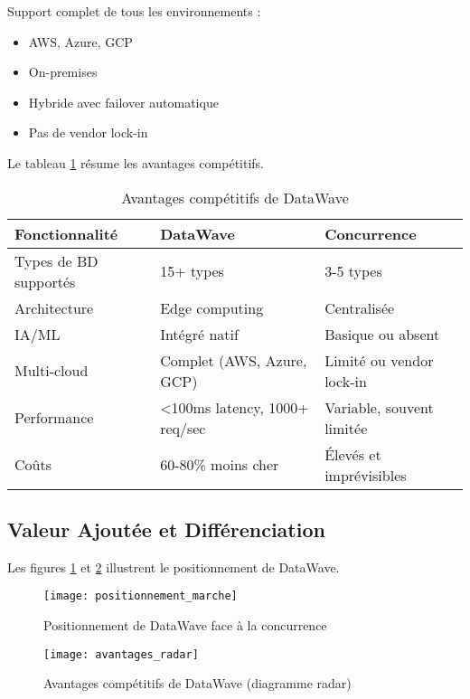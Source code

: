 Support complet de tous les environnements :
\begin{itemize}
    \item AWS, Azure, GCP
    \item On-premises
    \item Hybride avec failover automatique
    \item Pas de vendor lock-in
\end{itemize}

Le tableau \ref{tab:avantages_datawave} résume les avantages compétitifs.

\begin{table}[htpb]
\centering
\caption{Avantages compétitifs de DataWave}
\label{tab:avantages_datawave}
\begin{tabular}{|p{}|p{}|p{}|}
\hline
\textbf{Fonctionnalité} & \textbf{DataWave} & \textbf{Concurrence} \\
\hline
Types de BD supportés & 15+ types & 3-5 types \\
\hline
Architecture & Edge computing & Centralisée \\
\hline
IA/ML & Intégré natif & Basique ou absent \\
\hline
Multi-cloud & Complet (AWS, Azure, GCP) & Limité ou vendor lock-in \\
\hline
Performance & <100ms latency, 1000+ req/sec & Variable, souvent limitée \\
\hline
Coûts & 60-80\% moins cher & Élevés et imprévisibles \\
\hline
\end{tabular}
\end{table}

\subsection{Valeur Ajoutée et Différenciation}

Les figures \ref{fig:positionnement_marche} et \ref{fig:avantages_radar} illustrent le positionnement de DataWave.

\begin{figure}[htpb]
\centering
\texttt{[image: positionnement\_marche]}
\caption{Positionnement de DataWave face à la concurrence}
\label{fig:positionnement_marche}
\end{figure}

\begin{figure}[htpb]
\centering
\texttt{[image: avantages\_radar]}
\caption{Avantages compétitifs de DataWave (diagramme radar)}
\label{fig:avantages_radar}
\end{figure}

